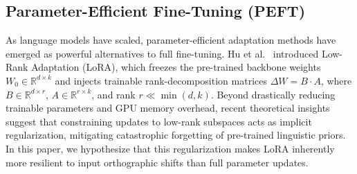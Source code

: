 \subsection{Parameter-Efficient Fine-Tuning (PEFT)}
As language models have scaled, parameter-efficient adaptation methods have emerged as powerful alternatives to full fine-tuning. Hu et al.~\cite{hu2022lora} introduced Low-Rank Adaptation (LoRA), which freezes the pre-trained backbone weights $W_0 \in \mathbb{R}^{d \times k}$ and injects trainable rank-decomposition matrices $\Delta W = B \cdot A$, where $B \in \mathbb{R}^{d \times r}$, $A \in \mathbb{R}^{r \times k}$, and rank $r \ll \min(d, k)$. Beyond drastically reducing trainable parameters and GPU memory overhead, recent theoretical insights suggest that constraining updates to low-rank subspaces acts as implicit regularization, mitigating catastrophic forgetting of pre-trained linguistic priors. In this paper, we hypothesize that this regularization makes LoRA inherently more resilient to input orthographic shifts than full parameter updates.

